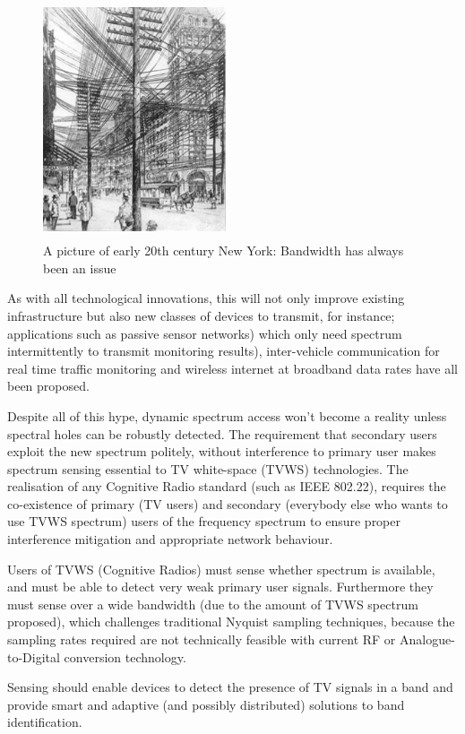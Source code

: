 \begin{figure}
\centering
\includegraphics[width=0.48\textwidth, height = 7cm]{cablesnewyork.jpg}
\caption{A picture of early 20th century New York: Bandwidth has always been an issue}
\label{newyork}
\end{figure}

As with all technological innovations, this will not only improve existing infrastructure but also new classes of devices to transmit, for instance; applications such as passive sensor networks) which only need spectrum intermittently to transmit monitoring results), inter-vehicle communication for real time traffic monitoring and wireless internet at broadband data rates have all been proposed.

Despite all of this hype, dynamic spectrum access won't become a reality unless spectral holes can be robustly detected. The requirement that secondary users exploit the new spectrum politely, without interference to primary user makes spectrum sensing essential to TV white-space (TVWS) technologies. The realisation of any Cognitive Radio standard (such as IEEE 802.22), requires the co-existence of primary (TV users) and secondary (everybody else who wants to use TVWS spectrum) users of the frequency spectrum to ensure proper interference mitigation and appropriate network behaviour. 

Users of TVWS (Cognitive Radios) must sense whether spectrum is available, and must be able to detect very weak primary user signals. Furthermore they must sense over a wide bandwidth (due to the amount of TVWS spectrum proposed), which challenges traditional Nyquist sampling techniques, because the sampling rates required are not technically feasible with current RF or Analogue-to-Digital conversion technology.

Sensing should enable devices to detect the presence of TV signals in a band and provide smart and adaptive (and possibly distributed) solutions to band identification.

